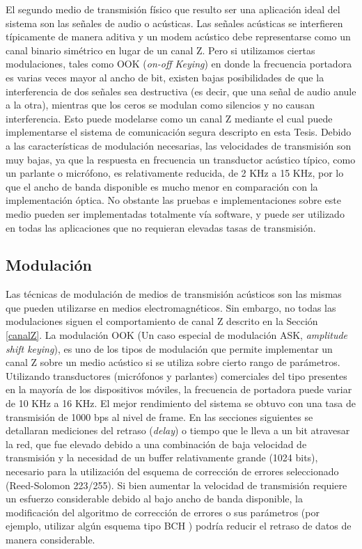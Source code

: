 El segundo medio de transmisión físico que resulto ser una aplicación ideal del sistema son las señales de audio o acústicas. Las señales acústicas se interfieren típicamente de manera aditiva y un modem acústico debe representarse como un canal binario simétrico en lugar de un canal Z. Pero si utilizamos ciertas modulaciones, tales como OOK (\textit{on-off Keying}) en donde la frecuencia portadora es varias veces mayor al ancho de bit, existen bajas posibilidades de que la interferencia de dos señales sea destructiva (es decir, que una señal de audio anule a la otra), mientras que los ceros se modulan como silencios y no causan interferencia. Esto puede modelarse como un canal Z mediante el cual puede implementarse el sistema de comunicación segura descripto en esta Tesis. Debido a las características de modulación necesarias, las velocidades de transmisión son muy bajas, ya que la respuesta en frecuencia un transductor acústico típico, como un parlante o micrófono, es relativamente reducida, de 2 KHz a 15 KHz, por lo que el ancho de banda disponible es mucho menor en comparación con la implementación óptica.
No obstante las pruebas e implementaciones sobre este medio pueden ser implementadas totalmente vía software, y puede ser utilizado en todas las aplicaciones que no requieran elevadas tasas de transmisión.

\subsection{Modulación}
Las técnicas de modulación de medios de transmisión acústicos son las mismas que pueden utilizarse en medios electromagnéticos.
Sin embargo, no todas las modulaciones siguen el comportamiento de canal Z descrito en la Sección \ref{canalZ}.
La modulación OOK (Un caso especial de modulación ASK, \textit{amplitude shift keying}), es uno de los tipos de modulación que permite implementar un canal Z sobre un medio acústico si se utiliza sobre cierto rango de parámetros. Utilizando transductores (micrófonos y parlantes) comerciales del tipo presentes en la mayoría de los dispositivos móviles, la frecuencia de portadora puede variar de 10 KHz a 16 KHz. El mejor rendimiento del sistema se obtuvo con una tasa de transmisión de 1000 bps al nivel de frame. En las secciones siguientes se detallaran mediciones del retraso (\textit{delay}) o tiempo que le lleva a un bit atravesar la red, que fue elevado debido a una combinación de baja velocidad de transmisión y la necesidad de un buffer relativamente grande (1024 bits), necesario para la utilización del esquema de corrección de errores seleccionado (Reed-Solomon 223/255). Si bien aumentar la velocidad de transmisión requiere un esfuerzo considerable debido al bajo ancho de banda disponible, la modificación del algoritmo de corrección de errores o sus parámetros (por ejemplo, utilizar algún esquema tipo BCH \cite{bose1960class}) podría reducir el retraso de datos de manera considerable.

